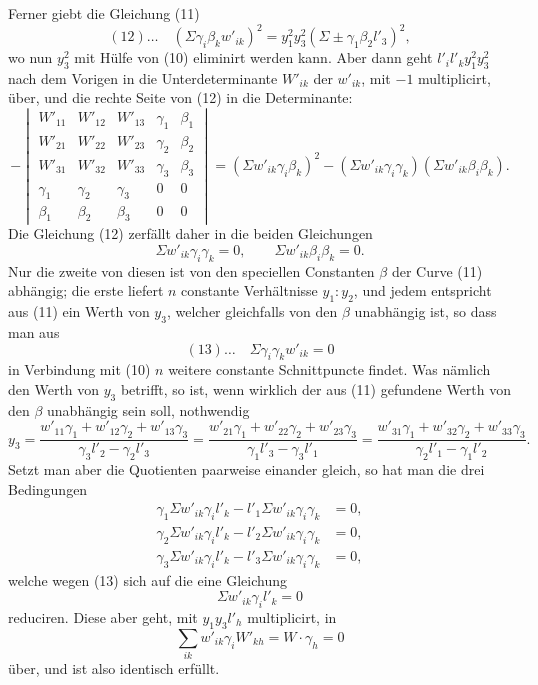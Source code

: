 \documentclass[10pt]{article}
\begin{document}
Ferner giebt die Gleichung (11)
\[
(12)\ldots\quad
(\Sigma\gamma_i\beta_kw'_{ik})^2
=y_1^2y_3^2(\Sigma\pm\gamma_1\beta_2l'_3)^2,
\]
wo nun \(y_3^2\) mit Hülfe von (10) eliminirt werden kann. Aber dann geht \(l'_il'_ky_1^2y_3^2\) nach dem Vorigen in die Unterdeterminante \(W'_{ik}\) der \(w'_{ik}\), mit \(-1\) multiplicirt, über, und die rechte Seite von (12) in die Determinante:
\[
-\begin{vmatrix}
W'_{11}&W'_{12}&W'_{13}&\gamma_1&\beta_1\\
W'_{21}&W'_{22}&W'_{23}&\gamma_2&\beta_2\\
W'_{31}&W'_{32}&W'_{33}&\gamma_3&\beta_3\\
\gamma_1&\gamma_2&\gamma_3&0&0\\
\beta_1&\beta_2&\beta_3&0&0
\end{vmatrix}
=(\Sigma w'_{ik}\gamma_i\beta_k)^2
-(\Sigma w'_{ik}\gamma_i\gamma_k)(\Sigma w'_{ik}\beta_i\beta_k).
\]
Die Gleichung (12) zerfällt daher in die beiden Gleichungen
\[
\Sigma w'_{ik}\gamma_i\gamma_k=0,\qquad
\Sigma w'_{ik}\beta_i\beta_k=0.
\]
Nur die zweite von diesen ist von den speciellen Constanten \(\beta\) der Curve (11) abhängig; die erste liefert \(n\) constante Verhältnisse \(y_1:y_2\), und jedem entspricht aus (11) ein Werth von \(y_3\), welcher gleichfalls von den \(\beta\) unabhängig ist, so dass man aus
\[
(13)\ldots\quad \Sigma\gamma_i\gamma_kw'_{ik}=0
\]
in Verbindung mit (10) \(n\) weitere constante Schnittpuncte findet. Was nämlich den Werth von \(y_3\) betrifft, so ist, wenn wirklich der aus (11) gefundene Werth von den \(\beta\) unabhängig sein soll, nothwendig
\[
y_3=
\frac{w'_{11}\gamma_1+w'_{12}\gamma_2+w'_{13}\gamma_3}{\gamma_3l'_2-\gamma_2l'_3}
=
\frac{w'_{21}\gamma_1+w'_{22}\gamma_2+w'_{23}\gamma_3}{\gamma_1l'_3-\gamma_3l'_1}
=
\frac{w'_{31}\gamma_1+w'_{32}\gamma_2+w'_{33}\gamma_3}{\gamma_2l'_1-\gamma_1l'_2}.
\]
Setzt man aber die Quotienten paarweise einander gleich, so hat man die drei Bedingungen
\[
\begin{aligned}
\gamma_1\Sigma w'_{ik}\gamma_il'_k-l'_1\Sigma w'_{ik}\gamma_i\gamma_k&=0,\\
\gamma_2\Sigma w'_{ik}\gamma_il'_k-l'_2\Sigma w'_{ik}\gamma_i\gamma_k&=0,\\
\gamma_3\Sigma w'_{ik}\gamma_il'_k-l'_3\Sigma w'_{ik}\gamma_i\gamma_k&=0,
\end{aligned}
\]
welche wegen (13) sich auf die eine Gleichung
\[
\Sigma w'_{ik}\gamma_il'_k=0
\]
reduciren. Diese aber geht, mit \(y_1y_3l'_h\) multiplicirt, in
\[
\sum_{ik}w'_{ik}\gamma_iW'_{kh}=W\cdot\gamma_h=0
\]
über, und ist also identisch erfüllt.
\end{document}
